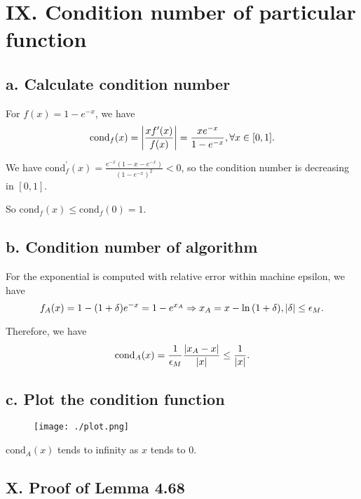 \documentclass[a4paper]{article}
\begin{document}
\section*{IX. Condition number of particular function}
\subsection*{a. Calculate condition number}
For $f(x) = 1 - e^{-x}$, we have
\begin{equation}
    \text{cond}_f(x) = \abs{\frac{x f^\prime(x)}{f(x)}} = \frac{xe^{-x}}{1-e^{-x}}, \forall x \in [0, 1]. 
\end{equation}

We have $\text{cond}_f^ \prime (x) = \frac{e^{-x}(1-x-e^{-x})}{(1-e^{-x})^2} < 0$, so the condition number is decreasing in $[0, 1]$.

So $\text{cond}_f(x) \leq \text{cond}_f(0) = 1$.

\subsection*{b. Condition number of algorithm}

For the exponential is computed with relative error within machine epsilon, we have
\begin{equation}
    f_A(x) = 1 - (1+\delta) e^{-x} = 1 - e^{x_A} \Rightarrow x_A = x - \ln\qty(1+\delta), \abs{\delta} \leq \epsilon_M.
\end{equation}

Therefore, we have
\begin{equation}
    \text{cond}_A(x) = \frac{1}{\epsilon_M} \frac{\abs{x_A-x}}{\abs{x}} \leq \frac{1}{\abs{x}}.
\end{equation}

\subsection*{c. Plot the condition function}
\begin{figure}[H]
    \centering
    \texttt{[image: ./plot.png]}
\end{figure}

$\text{cond}_A(x)$ tends to infinity as $x$ tends to $0$.


\subsection*{X. Proof of Lemma 4.68}
\end{document}
